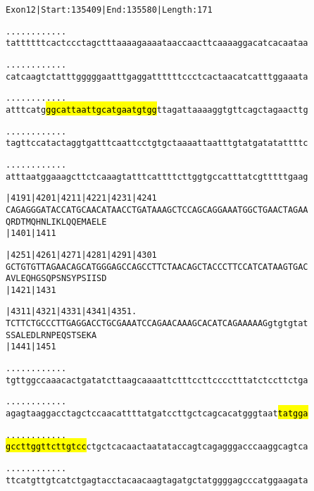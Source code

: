 \documentclass{article}
\begin{document}
\begin{alltt}
Exon 12 | Start: 135409 | End: 135580 | Length: 171

.    .    .    .    .    .    .    .    .    .    .    .    
tattttttcactccctagctttaaaagaaaataaccaacttcaaaaggacatcacaataa

.    .    .    .    .    .    .    .    .    .    .    .    
catcaagtctatttgggggaatttgaggattttttccctcactaacatcatttggaaata

.    .    .    .    .    .    .    .    .    .    .    .    
atttcatg\hl{ggcattaattgcatgaatgtgg}ttagattaaaaggtgttcagctagaacttg

.    .    .    .    .    .    .    .    .    .    .    .    
tagttccatactaggtgatttcaattcctgtgctaaaattaatttgtatgatatattttc

.    .    .    .    .    .    .    .    .    .    .    .    
atttaatggaaagcttctcaaagtatttcattttcttggtgccatttatcgtttttgaag

     |4191     |4201     |4211     |4221     |4231     |4241
CAGAGGGATACCATGCAACATAACCTGATAAAGCTCCAGCAGGAAATGGCTGAACTAGAA
Q  R  D  T  M  Q  H  N  L  I  K  L  Q  Q  E  M  A  E  L  E  
               |1401                         |1411          

     |4251     |4261     |4271     |4281     |4291     |4301
GCTGTGTTAGAACAGCATGGGAGCCAGCCTTCTAACAGCTACCCTTCCATCATAAGTGAC
A  V  L  E  Q  H  G  S  Q  P  S  N  S  Y  P  S  I  I  S  D  
               |1421                         |1431          

     |4311     |4321     |4331     |4341     |4351      .   
TCTTCTGCCCTTGAGGACCTGCGAAATCCAGAACAAAGCACATCAGAAAAAGgtgtgtat
S  S  A  L  E  D  L  R  N  P  E  Q  S  T  S  E  K  A        
               |1441                         |1451          

 .    .    .    .    .    .    .    .    .    .    .    .   
tgttggccaaacactgatatcttaagcaaaattctttccttcccctttatctccttctga

 .    .    .    .    .    .    .    .    .    .    .    .   
agagtaaggacctagctccaacattttatgatccttgctcagcacatgggtaat\hl{tatgga}

 .    .    .    .    .    .    .    .    .    .    .    .   
\hl{gccttggttcttgtcc}ctgctcacaactaatataccagtcagagggacccaaggcagtca

 .    .    .    .    .    .    .    .    .    .    .    .   
ttcatgttgtcatctgagtacctacaacaagtagatgctatggggagcccatggaagata

\end{alltt}
\end{document}
